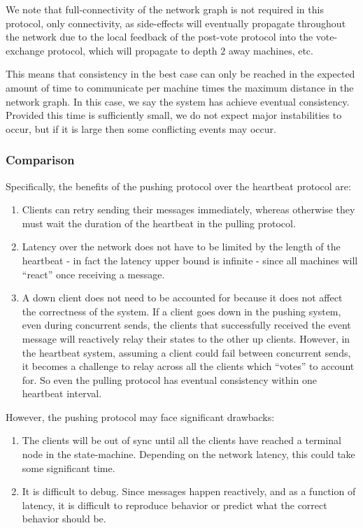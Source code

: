 \documentclass[%
               nonacm,sigconf,10pt]{acmart}
\begin{document}
We note that full-connectivity of the network graph is not required in this protocol, only connectivity, as side-effects will eventually propagate throughout the network due to the local feedback of the post-vote protocol into the vote-exchange protocol, which will propagate to depth $2$ away machines, etc.

This means that consistency in the best case can only be reached in the expected amount of time to communicate per machine times the maximum distance in the network graph. In this case, we say the system has achieve eventual consistency. Provided this time is sufficiently small, we do not expect major instabilities to occur, but if it is large then some conflicting events may occur.

\subsubsection{Comparison}\label{subsubsec:comp-protos}

Specifically, the benefits of the pushing protocol over the heartbeat protocol are:

\begin{enumerate}
    \item Clients can retry sending their messages immediately, whereas otherwise they must wait the duration of the heartbeat in the pulling protocol.
    \item Latency over the network does not have to be limited by the length of the heartbeat - in fact the latency upper bound is infinite - since all machines will ``react'' once receiving a message.
    \item A down client does not need to be accounted for because it does not affect the correctness of the system. If a client goes down in the pushing system, even during concurrent sends, the clients that successfully received the event message will reactively relay their states to the other up clients. However, in the heartbeat system, assuming a client could fail between concurrent sends, it becomes a challenge to relay across all the clients which ``votes'' to account for. So even the pulling protocol has eventual consistency within one heartbeat interval.
\end{enumerate}

However, the pushing protocol may face significant drawbacks:

\begin{enumerate}
    \item The clients will be out of sync until all the clients have reached a terminal node in the state-machine. Depending on the network latency, this could take some significant time.
    \item It is difficult to debug. Since messages happen reactively, and as a function of latency, it is difficult to reproduce behavior or predict what the correct behavior should be.
\end{enumerate}
\end{document}
